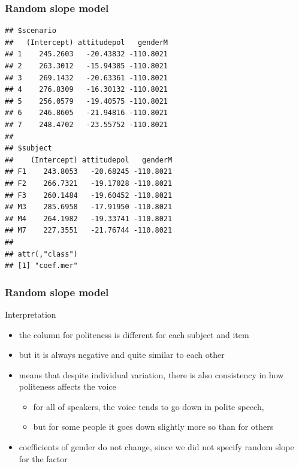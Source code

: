 \documentclass[10p]{beamer}\usepackage[]{graphicx}\usepackage[]{color}
\makeatletter
\newenvironment{kframe}{%
 \def\at@end@of@kframe{}%
 \ifinner\ifhmode%
  \def\at@end@of@kframe{\end{minipage}}%
  \begin{minipage}{\columnwidth}%
 \fi\fi%
 \def\FrameCommand##1{\hskip\@totalleftmargin \hskip-\fboxsep
 \colorbox{shadecolor}{##1}\hskip-\fboxsep
     \hskip-\linewidth \hskip-\@totalleftmargin \hskip\columnwidth}%
 \MakeFramed {\advance\hsize-\width
   \@totalleftmargin\z@ \linewidth\hsize
   \@setminipage}}%
 {\par\unskip\endMakeFramed%
 \at@end@of@kframe}
\newenvironment{knitrout}{}{} %
\makeatother
\begin{document}
\begin{frame}[fragile]
\frametitle{Random slope model}
\begin{knitrout}\scriptsize
{}\color{fgcolor}\begin{kframe}
\begin{verbatim}
## $scenario
##   (Intercept) attitudepol   genderM
## 1    245.2603   -20.43832 -110.8021
## 2    263.3012   -15.94385 -110.8021
## 3    269.1432   -20.63361 -110.8021
## 4    276.8309   -16.30132 -110.8021
## 5    256.0579   -19.40575 -110.8021
## 6    246.8605   -21.94816 -110.8021
## 7    248.4702   -23.55752 -110.8021
## 
## $subject
##    (Intercept) attitudepol   genderM
## F1    243.8053   -20.68245 -110.8021
## F2    266.7321   -19.17028 -110.8021
## F3    260.1484   -19.60452 -110.8021
## M3    285.6958   -17.91950 -110.8021
## M4    264.1982   -19.33741 -110.8021
## M7    227.3551   -21.76744 -110.8021
## 
## attr(,"class")
## [1] "coef.mer"
\end{verbatim}
\end{kframe}
\end{knitrout}
\end{frame}

\begin{frame}
\frametitle{Random slope model}
Interpretation
\begin{itemize}
\item the column for politeness is different for each subject and item
\item but it is always negative and quite similar to each other
\item means that despite individual variation, there is also consistency in how politeness affects the voice
  \begin{itemize}
  \item for all of speakers, the voice tends to go down in polite speech,
  \item but for some people it goes down slightly more so than for others
  \end{itemize}
\item coefficients of gender do not change, since we did not specify random slope for the factor
\end{itemize}
\end{frame}
\end{document}
